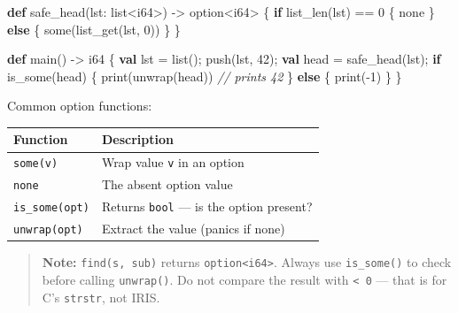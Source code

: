 \documentclass[
  english,
]{book}
\newenvironment{Shaded}{\begin{snugshade}}{\end{snugshade}}
\newcommand{\CommentTok}[1]{\textcolor[rgb]{0.42,0.60,0.33}{\textit{#1}}}
\newcommand{\ConstantTok}[1]{\textcolor[rgb]{0.31,0.76,1.00}{#1}}
\newcommand{\ControlFlowTok}[1]{\textcolor[rgb]{0.77,0.53,0.75}{\textbf{#1}}}
\newcommand{\DataTypeTok}[1]{\textcolor[rgb]{0.31,0.79,0.69}{#1}}
\newcommand{\DecValTok}[1]{\textcolor[rgb]{0.71,0.81,0.66}{#1}}
\newcommand{\FunctionTok}[1]{\textcolor[rgb]{0.86,0.86,0.67}{#1}}
\newcommand{\KeywordTok}[1]{\textcolor[rgb]{0.34,0.61,0.84}{\textbf{#1}}}
\newcommand{\NormalTok}[1]{\textcolor[rgb]{0.83,0.83,0.83}{#1}}
\newcommand{\OperatorTok}[1]{\textcolor[rgb]{0.83,0.83,0.83}{#1}}
\begin{document}
\begin{Shaded}
\begin{Highlighting}[]
\KeywordTok{def}\NormalTok{ safe\_head(lst: }\DataTypeTok{list}\OperatorTok{\textless{}}\DataTypeTok{i64}\OperatorTok{\textgreater{}}\NormalTok{) }\OperatorTok{{-}\textgreater{}} \DataTypeTok{option}\OperatorTok{\textless{}}\DataTypeTok{i64}\OperatorTok{\textgreater{}}\NormalTok{ \{}
    \ControlFlowTok{if} \FunctionTok{list\_len}\NormalTok{(lst) }\OperatorTok{==} \DecValTok{0}\NormalTok{ \{}
        \ConstantTok{none}
\NormalTok{    \} }\ControlFlowTok{else}\NormalTok{ \{}
        \FunctionTok{some}\NormalTok{(}\FunctionTok{list\_get}\NormalTok{(lst, }\DecValTok{0}\NormalTok{))}
\NormalTok{    \}}
\NormalTok{\}}

\KeywordTok{def}\NormalTok{ main() }\OperatorTok{{-}\textgreater{}} \DataTypeTok{i64}\NormalTok{ \{}
    \KeywordTok{val}\NormalTok{ lst }\OperatorTok{=} \DataTypeTok{list}\NormalTok{();}
    \FunctionTok{push}\NormalTok{(lst, }\DecValTok{42}\NormalTok{);}
    \KeywordTok{val}\NormalTok{ head }\OperatorTok{=}\NormalTok{ safe\_head(lst);}
    \ControlFlowTok{if} \FunctionTok{is\_some}\NormalTok{(head) \{}
        \FunctionTok{print}\NormalTok{(unwrap(head))   }\CommentTok{// prints 42}
\NormalTok{    \} }\ControlFlowTok{else}\NormalTok{ \{}
        \FunctionTok{print}\NormalTok{(}\OperatorTok{{-}}\DecValTok{1}\NormalTok{)}
\NormalTok{    \}}
\NormalTok{\}}
\end{Highlighting}
\end{Shaded}

Common option functions:

\begin{longtable}[]{@{}ll@{}}
\toprule\noalign{}
Function & Description \\
\midrule\noalign{}
\endhead
\bottomrule\noalign{}
\endlastfoot
\texttt{some(v)} & Wrap value \texttt{v} in an option \\
\texttt{none} & The absent option value \\
\texttt{is\_some(opt)} & Returns \texttt{bool} --- is the option
present? \\
\texttt{unwrap(opt)} & Extract the value (panics if none) \\
\end{longtable}

\begin{quote}
\textbf{Note:} \texttt{find(s,\ sub)} returns
\texttt{option\textless{}i64\textgreater{}}. Always use
\texttt{is\_some()} to check before calling \texttt{unwrap()}. Do not
compare the result with \texttt{\textless{}\ 0} --- that is for C's
\texttt{strstr}, not IRIS.
\end{quote}
\end{document}
